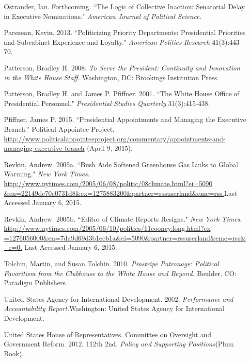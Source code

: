 \documentclass[12pt]{article}
\begin{document}
\noindent \hangindent=0.7cm Ostrander, Ian. Forthcoming. ``The Logic of Collective Inaction: Senatorial Delay in Executive Nominations." \textit{American Journal of Political Science}.

\noindent \hangindent=0.7cm Parsneau, Kevin. 2013. ``Politicizing Priority Departments: Presidential Priorities and Subcabinet Experience and Loyalty." \textit{American Politics Research} 41(3):443-70.

\noindent \hangindent=0.7cm Patterson, Bradley H. 2008. \textit{To Serve the President: Continuity and Innovation in the White House Staff.} Washington, DC: Brookings Institution Press.

\noindent \hangindent=0.7cm Patterson, Bradley H. and James P. Pfiffner. 2001. ``The White House Office of Presidential Personnel." \textit{Presidential Studies Quarterly} 31(3):415-438.

\noindent \hangindent=0.7cm Pfiffner, James P. 2015. ``Presidential Appointments and Managing the Executive Branch." Political Appointee Project. \url{http://www.politicalappointeeproject.org/commentary/appointments-and-managing-executive-branch} (April 9, 2015).

\noindent \hangindent=0.7cm Revkin, Andrew. 2005a. ``Bush Aide Softened Greenhouse Gas Links to Global Warming." \textit{New York Times}. \url{http://www.nytimes.com/2005/06/08/politic/08climate.html?ei=5090 &en=22149dc70c0731d8&ex=1275883200&partner=rssuserland&emc=rss.}Last Accessed January 6, 2015.

\noindent \hangindent=0.7cm Revkin, Andrew. 2005b. ``Editor of Climate Reports Resigns." \textit{New York Times}. \url{http://www.nytimes.com/2005/06/10/politics/11cooney.long.html?ex =1276056000&en=7da9d69d3b1ecb1a&ei=5090&partner=rssuserland&emc=rss&_r=0.} Last Accessed January 6, 2015. 

\noindent \hangindent=0.7cm Tolchin, Martin, and Susan Tolchin. 2010. \textit{Pinstripe Patronage: Political Favoritism from the Clubhouse to the White House and Beyond.} Boulder, CO: Paradigm Publishers.

\noindent \hangindent=0.7cm United States Agency for International Development. 2002. \textit{Performance and Accountability Report.}Washington: United States Agency for International Development.

\noindent \hangindent=0.7cm United States House of Representatives. Committee on Oversight and Government Reform. 2012. 112th 2nd. \textit{Policy and Supporting Positions}(Plum Book). 
\end{document}
